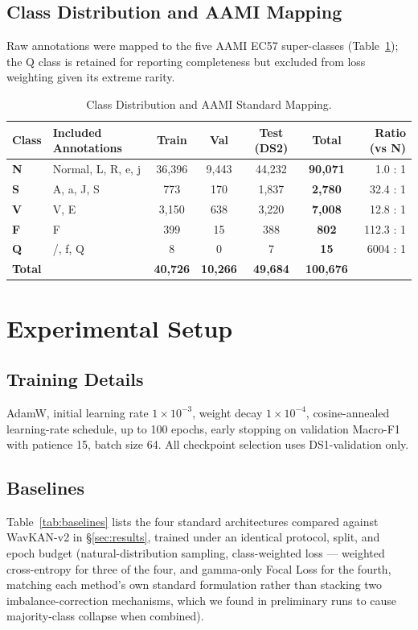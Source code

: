\documentclass[journal,twoside,web]{ieeecolor}
\begin{document}
\subsection{Class Distribution and AAMI Mapping}
Raw annotations were mapped to the five AAMI EC57 super-classes \cite{xiao_deep_2023, luz_survey_2016} (Table~\ref{tab:class_dist}); the Q class is retained for reporting completeness but excluded from loss weighting given its extreme rarity.

\begin{table}[!t]
\caption{Class Distribution and AAMI Standard Mapping.}
\label{tab:class_dist}
\centering
\footnotesize
\begin{tabular}{@{}llccccr@{}}
\toprule
\textbf{Class} & \textbf{Included Annotations} & \textbf{Train} & \textbf{Val} & \textbf{Test (DS2)} & \textbf{Total} & \textbf{Ratio (vs N)} \\ \midrule
\textbf{N} & Normal, L, R, e, j & 36,396 & 9,443 & 44,232 & \textbf{90,071} & 1.0 : 1 \\
\textbf{S} & A, a, J, S & 773 & 170 & 1,837 & \textbf{2,780} & 32.4 : 1 \\
\textbf{V} & V, E & 3,150 & 638 & 3,220 & \textbf{7,008} & 12.8 : 1 \\
\textbf{F} & F & 399 & 15 & 388 & \textbf{802} & 112.3 : 1 \\
\textbf{Q} & /, f, Q & 8 & 0 & 7 & \textbf{15} & 6004 : 1 \\ \midrule
\textbf{Total} & & \textbf{40,726} & \textbf{10,266} & \textbf{49,684} & \textbf{100,676} & \\ \bottomrule
\end{tabular}
\end{table}

\section{Experimental Setup}

\subsection{Training Details}
AdamW, initial learning rate $1\times10^{-3}$, weight decay $1\times10^{-4}$, cosine-annealed learning-rate schedule, up to 100 epochs, early stopping on validation Macro-F1 with patience 15, batch size 64. All checkpoint selection uses DS1-validation only.

\subsection{Baselines}
Table~\ref{tab:baselines} lists the four standard architectures compared against WavKAN-v2 in \S\ref{sec:results}, trained under an identical protocol, split, and epoch budget (natural-distribution sampling, class-weighted loss --- weighted cross-entropy for three of the four, and gamma-only Focal Loss for the fourth, matching each method's own standard formulation rather than stacking two imbalance-correction mechanisms, which we found in preliminary runs to cause majority-class collapse when combined).
\end{document}
